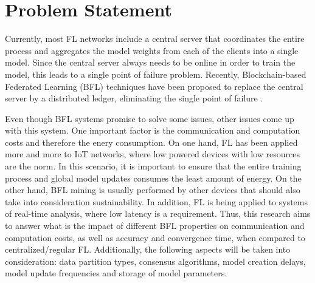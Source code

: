 
\section{Problem Statement}


Currently, most FL networks include a central server that coordinates the entire process and aggregates the model weights from each of the clients into a single model. Since the central server always needs to be online in order to train the model, this leads to a single point of failure problem. Recently, Blockchain-based Federated Learning (BFL) techniques have been proposed to replace the central server by a distributed ledger, eliminating the single point of failure \cite{10.48550/arxiv.2009.09338, 9403374}.


Even though BFL systems promise to solve some issues, other issues come up with this system. One important factor is the communication and computation costs and therefore the enery consumption. On one hand, FL has been applied more and more to IoT networks, where low powered devices with low resources are the norm. In this scenario, it is important to ensure that the entire training process and global model updates consumes the least amount of energy. On the other hand, BFL mining is usually performed by other devices that should also take into consideration sustainability. In addition, FL is being applied to systems of real-time analysis, where low latency is a requirement. Thus, this research aims to answer what is the impact of different BFL properties on communication and computation costs, as well as accuracy and convergence time, when compared to centralized/regular FL. Additionally, the following aspects will be taken into consideration: data partition types, consensus algorithms, model creation delays, model update frequencies and storage of model parameters.

